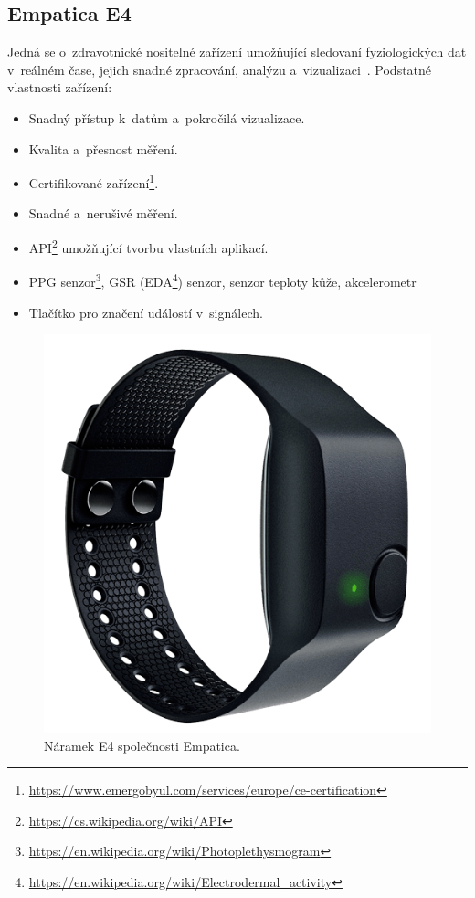     \subsection{Empatica E4}
    \label{empatica_e4}
     Jedná se o~zdravotnické nositelné zařízení umožňující sledovaní fyziologických dat v~reálném čase, jejich snadné zpracování, analýzu a~vizualizaci~\cite{e4}. Podstatné vlastnosti zařízení:
        \begin{multicols}{2}
            \begin{itemize}
                \item Snadný přístup k~datům a~pokročilá vizualizace.  
                \item Kvalita a~přesnost měření.
                \item Certifikované zařízení\footnote{\url{https://www.emergobyul.com/services/europe/ce-certification}}. 
                \item Snadné a~nerušivé měření.
                \item API\footnote{\url{https://cs.wikipedia.org/wiki/API}} umožňující tvorbu vlastních aplikací.
                \item PPG senzor\footnote{\url{https://en.wikipedia.org/wiki/Photoplethysmogram}}, GSR (EDA\footnote{\url{https://en.wikipedia.org/wiki/Electrodermal_activity}}) senzor, senzor teploty kůže, akcelerometr
                \item Tlačítko pro značení událostí v~signálech.
            \end{itemize}
        \columnbreak
            \begin{figure}[H]
                \centering
                \includegraphics[scale=0.3]{obrazky-figures/e4-front_light.png}
                \caption{Náramek E4 společnosti Empatica.}
                \label{fig:e4_fig}
            \end{figure}    
        \end{multicols}
        
